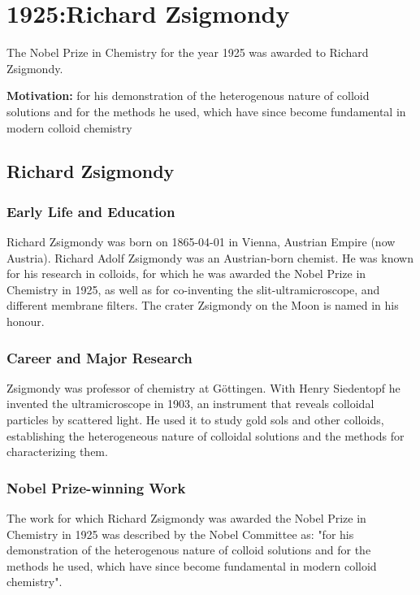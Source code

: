 \chapter{1925:Richard Zsigmondy}
\label{chap:chemistry1925}

The Nobel Prize in Chemistry for the year 1925 was awarded to Richard Zsigmondy.

\textbf{Motivation:}
for his demonstration of the heterogenous nature of colloid solutions and for the methods he used, which have since become fundamental in modern colloid chemistry

\section{Richard Zsigmondy}

\subsection*{Early Life and Education}

Richard Zsigmondy was born on 1865-04-01 in Vienna, Austrian Empire (now Austria).
Richard Adolf Zsigmondy was an Austrian-born chemist. He was known for his research in colloids, for which he was awarded the Nobel Prize in Chemistry in 1925, as well as for co-inventing the slit-ultramicroscope, and different membrane filters. The crater Zsigmondy on the Moon is named in his honour.

\subsection*{Career and Major Research}

Zsigmondy was professor of chemistry at Göttingen. With Henry Siedentopf he invented the ultramicroscope in 1903, an instrument that reveals colloidal particles by scattered light. He used it to study gold sols and other colloids, establishing the heterogeneous nature of colloidal solutions and the methods for characterizing them.

\subsection*{Nobel Prize-winning Work}

The work for which Richard Zsigmondy was awarded the Nobel Prize in Chemistry in 1925 was described by the Nobel Committee as: "for his demonstration of the heterogenous nature of colloid solutions and for the methods he used, which have since become fundamental in modern colloid chemistry".

